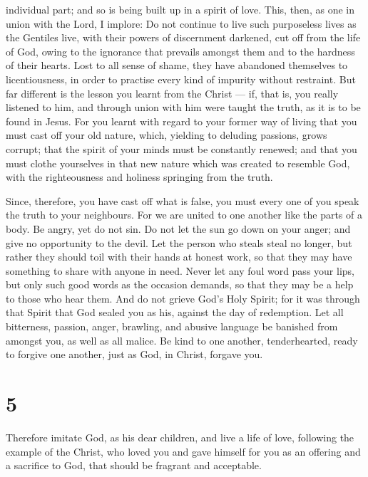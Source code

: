 individual part; and so is being built up in a spirit of love.
 This, then, as one in union with the Lord, I implore: Do
not continue to live such purposeless lives as the Gentiles live,
 with their powers of discernment darkened, cut off from
the life of God, owing to the ignorance that prevails amongst them and
to the hardness of their hearts.  Lost to all sense of
shame, they have abandoned themselves to licentiousness, in order to
practise every kind of impurity without restraint.  But far
different is the lesson you learnt from the Christ --- if, that is, you
really listened to him,  and through union with him were
taught the truth, as it is to be found in Jesus.  For you
learnt with regard to your former way of living that you must cast off
your old nature, which, yielding to deluding passions, grows corrupt;
 that the spirit of your minds must be constantly renewed;
 and that you must clothe yourselves in that new nature
which was created to resemble God, with the righteousness and holiness
springing from the truth.

 Since, therefore, you have cast off what is false, you
must every one of you speak the truth to your neighbours. For we are
united to one another like the parts of a body.  Be angry,
yet do not sin. Do not let the sun go down on your anger; 
and give no opportunity to the devil.  Let the person who
steals steal no longer, but rather they should toil with their hands at
honest work, so that they may have something to share with anyone in
need.  Never let any foul word pass your lips, but only
such good words as the occasion demands, so that they may be a help to
those who hear them.  And do not grieve God's Holy Spirit;
for it was through that Spirit that God sealed you as his, against the
day of redemption.  Let all bitterness, passion, anger,
brawling, and abusive language be banished from amongst you, as well as
all malice.  Be kind to one another, tenderhearted, ready
to forgive one another, just as God, in Christ, forgave you.

\hypertarget{section-4}{%
\section{5}\label{section-4}}

 Therefore imitate God, as his dear children, 
and live a life of love, following the example of the Christ, who loved
you and gave himself for you as an offering and a sacrifice to God, that
should be fragrant and acceptable.


